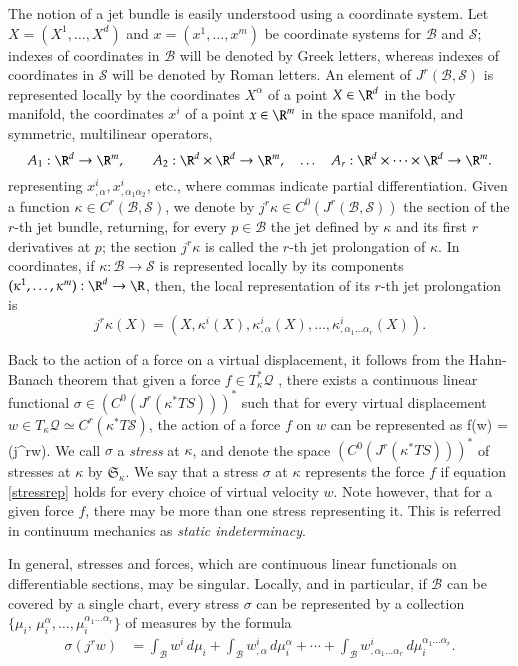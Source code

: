\documentclass[smallextended]{svjour3}
\begin{document}
The notion of a jet bundle is easily understood using a coordinate system. Let $X = (X^1,\dots,X^d)$ and $x = (x^1,\dots,x^m)$ be coordinate systems for ${\mathcal{B}}$ and ${\mathcal{S}}$; indexes of coordinates in ${\mathcal{B}}$ will be denoted by Greek letters, whereas indexes of coordinates in ${\mathcal{S}}$ will be denoted by Roman letters. An element of $J^r({\mathcal{B}},{\mathcal{S}})$ is  represented  locally by the coordinates $X^\alpha$ of a point $X\in\R^d$ in the body manifold,  the coordinates $x^i$ of a point $x\in\R^m$ in the space manifold, and symmetric, multilinear operators,
\[
A_1: \R^d\to\R^m,
\qquad
A_2: \R^d\times\R^d\to\R^m,
\quad
\ldots
\quad
A_r:  \R^d\times\cdots\times\R^d\to\R^m.
\]
representing $x^i_{,\alpha},x^i_{,\alpha_1\alpha_2}$, etc., where commas indicate partial differentiation. Given a function $\kappa\in C^r({\mathcal{B}},{\mathcal{S}})$, we denote by $j^r\kappa \in C^0(J^r({\mathcal{B}},{\mathcal{S}}))$ the section of the $r$-th jet bundle, returning, for every $p\in{\mathcal{B}}$ the jet defined by $\kappa$ and its first $r$ derivatives at $p$; the section $j^r\kappa$ is called the $r$-th jet prolongation of $\kappa$. In coordinates,  if  $\kappa:{\mathcal{B}}\to{\mathcal{S}}$ is represented locally by its components $(\kappa^1,\dots,\kappa^m):\R^d\to\R$, then, the local representation of its $r$-th jet prolongation is
\[
j^r\kappa(X) = (X,\kappa^i(X),\kappa^i_{,\alpha}(X),\dots,\kappa^i_{,\alpha_1\dots \alpha_r}(X)).
\]

Back to the action of a force on a virtual displacement, it follows from the Hahn-Banach theorem that given a force $f\in T_\kappa^*{\mathcal{Q}}$ , there exists a continuous linear functional $\sigma \in (C^0(J^r({\kappa^*TS})))^*$ such that for every   virtual displacement $w\in T_\kappa{\mathcal{Q}}\simeq C^r(\kappa^*T{\mathcal{S}})$, the action of a force $f$ on $w$ can be represented as
\beq
f(w) = \sigma(j^rw).
\label{stressrep}
\eeq
We call $\sigma$ a \emph{stress} at $\kappa$, and denote the space $(C^0(J^r({\kappa^*TS})))^*$ of stresses at $\kappa$ by $\mathfrak{S}_\kappa$. We say that a stress $\sigma$ at $\kappa$ represents the force $f$ if equation \eqref{stressrep} holds for every choice of virtual velocity $w$. Note however, that for a given force $f$, there may be more than one stress representing it. This is referred in continuum mechanics as  \emph{static indeterminacy}. 

In general,  stresses and forces, which are continuous linear functionals on differentiable sections, may be singular. Locally, and in particular, if ${\mathcal{B}}$ can be covered by a single chart, every stress $\sigma$ can be represented by  a collection $\{\mu_i,\,\mu_i^{\alpha},\ldots,\mu_i^{\alpha_1\ldots \alpha_r}\}$ of measures  by the formula 
\[
\begin{split}
\sigma(j^rw) &= \int_{\mathcal{B}} w^i\, d\mu_i+\int_{\mathcal{B}} w^i_{,\alpha} \, d\mu^\alpha_i 
+\cdots +
\int_{\mathcal{B}} w^i_{,\alpha_1\ldots \alpha_r} \, d\mu_i^{\alpha_1 \ldots \alpha_r}.       
\end{split}
\]
\end{document}
